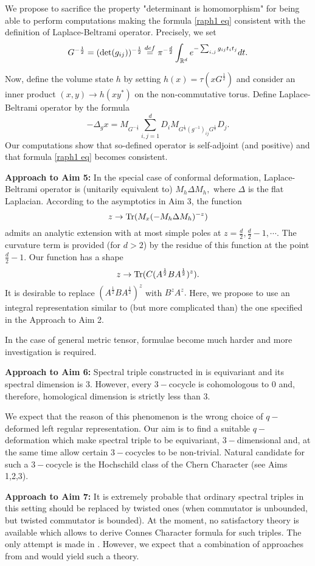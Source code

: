 \documentclass{article}
\begin{document}
We propose to sacrifice the property "determinant is homomorphism" for being able to perform computations making the formula \eqref{raph1 eq} consistent with the definition of Laplace-Beltrami operator. Precisely, we set 
$$G^{-\frac12}=({\rm det}(g_{ij}))^{-\frac12}\stackrel{def}{=}\pi^{-\frac{d}{2}}\int_{\mathbb{R}^d}e^{-\sum_{i,j}g_{ij}t_it_j}dt.$$

Now, define the volume state $h$ by setting $h(x)=\tau(xG^{\frac12})$ and consider an inner product $(x,y)\to h(xy^*)$ on the non-commutative torus. Define Laplace-Beltrami operator by the formula
$$-\Delta_g x=M_{G^{-\frac12}}\sum_{i,j=1}^dD_iM_{G^{\frac14}(g^{-1})_{ij}G^{\frac14}}D_j.$$
Our computations show that so-defined operator is self-adjoint (and positive) and that formula \eqref{raph1 eq} becomes consistent.

{\bf Approach to Aim 5:} In the special case of conformal deformation, Laplace-Beltrami operator is (unitarily equivalent to) $M_h\Delta M_h,$ where $\Delta$ is the flat Laplacian. According to the asymptotics in Aim 3, the function
$$z\to {\rm Tr}(M_x(-M_h\Delta M_h)^{-z})$$
admits an analytic extension with at most simple poles at $z=\frac{d}{2},\frac{d}{2}-1,\cdots.$ The curvature term is provided (for $d>2$) by the residue of this function at the point $\frac{d}{2}-1.$ Our function has a shape
$$z\to {\rm Tr}(C(A^{\frac12}BA^{\frac12})^z).$$
It is desirable to replace $(A^{\frac12}BA^{\frac12})^z$ with $B^zA^z.$ Here, we propose to use an integral representation similar to (but more complicated than) the one specified in  the Approach to Aim 2.

In the case of general metric tensor, formulae become much harder and more investigation is required.

{\bf Approach to Aim 6:} Spectral triple constructed in \cite{ChakrabortyPal} is equivariant and its spectral dimension is $3.$ However, every $3-$cocycle is cohomologous to $0$ and, therefore, homological dimension is strictly less than $3.$ 

We expect that the reason of this phenomenon is the wrong choice of $q-$deformed left regular representation. Our aim is to find a suitable $q-$deformation which make spectral triple to be equivariant, $3-$dimensional and, at the same time allow certain $3-$cocycles to be non-trivial. Natural candidate for such a $3-$cocycle is the Hochschild class of the Chern Character (see Aims 1,2,3).

{\bf Approach to Aim 7:} It is extremely probable that ordinary spectral triples in this setting should be replaced by twisted ones (when commutator is unbounded, but twisted commutator is bounded). At the moment, no satisfactory theory is available which allows to derive Connes Character formula for such triples. The only attempt is made in \cite{MasF}. However, we expect that a combination of approaches from \cite{MasF} and \cite{CRSZ} would yield such a theory.
\end{document}
